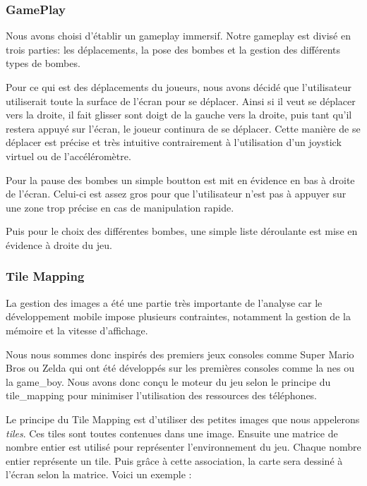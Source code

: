 	\subsubsection{GamePlay}
	
		Nous avons choisi d'établir un gameplay immersif.
		Notre gameplay est divisé en trois parties: les déplacements, la pose des bombes et la gestion des différents types de bombes.
		
		Pour ce qui est des déplacements du joueurs, nous avons décidé que 
		l'utilisateur utiliserait toute la surface de l'écran pour se déplacer.
		Ainsi si il veut se déplacer vers la droite, il fait glisser sont doigt 
		de la gauche vers la droite, puis tant qu'il restera appuyé sur l'écran,
		le joueur continura de se déplacer.
		Cette manière de se déplacer est précise et très intuitive contrairement
		à l'utilisation d'un joystick virtuel ou de l'accéléromètre.
		
		Pour la pause des bombes un simple boutton est mit en évidence en bas à
		 droite de l'écran.
		 Celui-ci est assez gros pour que l'utilisateur n'est pas à appuyer sur
		 une zone trop précise en cas de manipulation rapide.
		
		Puis pour le choix des différentes bombes, une simple liste déroulante 
		est mise en évidence à droite du jeu.\\
		
		\subsubsection{Tile Mapping}

			La gestion des images a été une partie très importante de l'analyse
			car le développement mobile impose plusieurs contraintes, notamment 
			la gestion de la mémoire et la vitesse d'affichage.
			
			Nous nous sommes donc inspirés des premiers jeux consoles comme 
			Super Mario Bros ou Zelda qui ont été développés sur les premières 
			consoles comme la \gls{nes} ou la \gls{game_boy}.
			Nous avons donc conçu le moteur du jeu selon le principe du \gls{tile_mapping} 
			pour minimiser l'utilisation des ressources des téléphones.
		
			Le principe du Tile Mapping est d'utiliser des petites images que nous appelerons \textit{tiles}.
			Ces tiles sont toutes contenues dans une image.
			Ensuite une matrice de nombre entier est utilisé pour représenter l'environnement du jeu.
			Chaque nombre entier représente un tile.
			Puis grâce à cette association, la carte sera dessiné à l'écran selon la matrice.
			Voici un exemple :
		
